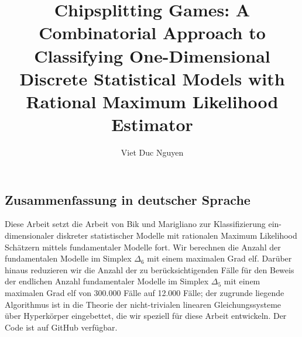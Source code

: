 \documentclass[masters]{ucbthesis}
\numberwithin{algorithm}{chapter} %
\theoremstyle{definition}
\begin{document}

\title{Chipsplitting Games: A Combinatorial Approach to Classifying One-Dimensional Discrete Statistical Models with Rational Maximum Likelihood Estimator}
\author{Viet Duc Nguyen}


\maketitle
\copyrightpage

\begin{alwayssingle}
\section*{Zusammenfassung in deutscher Sprache}

Diese Arbeit setzt die Arbeit von Bik und Marigliano zur Klassifizierung ein-dimensionaler diskreter statistischer Modelle mit rationalen Maximum Likelihood Schätzern mittels fundamentaler Modelle fort. Wir berechnen die Anzahl der fundamentalen Modelle im Simplex \( \Delta_6 \) mit einem maximalen Grad elf. Darüber hinaus reduzieren wir die Anzahl der zu berücksichtigenden Fälle für den Beweis der endlichen Anzahl fundamentaler Modelle im Simplex \( \Delta_5 \) mit einem maximalen Grad elf von 300.000 Fälle auf 12.000 Fälle; der zugrunde liegende Algorithmus ist in die Theorie der nicht-trivialen linearen Gleichungssysteme über Hyperkörper eingebettet, die wir speziell für diese Arbeit entwickeln. Der Code ist auf GitHub verfügbar.

\end{alwayssingle}
\end{document}
